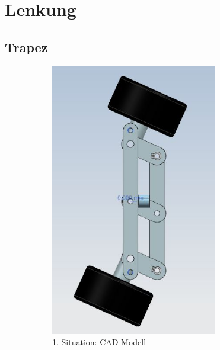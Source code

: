 
\section{Lenkung}


\subsection{Trapez}

\begin{figure} [hbp]
	\centering
	\begin{subfigure}[b]{0.4\textwidth}
		\includegraphics[width=0.8\textwidth]{fig/Trapezlenkung3.JPG}
		\caption{1. Situation: CAD-Modell}
	\end{subfigure}
	\hfill
	\begin{subfigure}[b]{0.36\textwidth}

\end{subfigure}
\end{figure}
